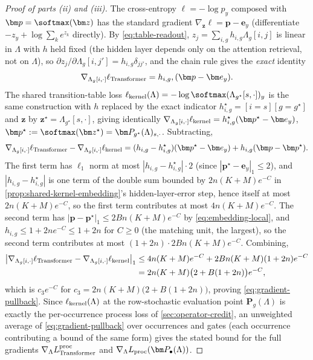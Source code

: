 \begin{proof}[Proof of parts (ii) and (iii)]
The cross-entropy $\ell=-\log p_y$ composed with $\bm p=\softmax(\bm z)$
has the standard gradient $\nabla_{\bm z}\ell=\bm p-\bm e_y$ (differentiate
$-z_y+\log\sum_ke^{z_k}$ directly). By \cref{eq:table-readout},
$z_j=\sum_{i,g}h_{i,g}\Lambda_g[i,j]$ is linear in $\Lambda$ with $h$ held fixed (the
hidden layer depends only on the attention retrieval, not on $\Lambda$), so
$\partial z_j/\partial \Lambda_g[i,j']=h_{i,g}\delta_{jj'}$, and the chain rule
gives the \emph{exact} identity
\begin{equation}
 \nabla_{\Lambda_g[i,\cdot]}\ell_{\rm Transformer}=h_{i,g},(\bm p-\bm e_y).
 \label{eq:exact-grad-identity}
\end{equation}
The shared transition-table loss $\ell_{\rm kernel}(\Lambda)=-\log\softmax(\Lambda_{g^\star}[s,\cdot])_y$
is the same construction with $h$ replaced by the exact indicator
$h^\star_{i,g}=[i=s][g=g^\star]$ and $\bm z$ by
$\bm z^\star=\Lambda_{g^\star}[s,\cdot]$, giving identically
$\nabla_{\Lambda_g[i,\cdot]}\ell_{\rm kernel}=h^\star_{i,g}(\bm p^\star-\bm e_y)$,
$\bm p^\star:=\softmax(\bm z^\star)=\bm P_{g^\star}(\Lambda)_{s,\cdot}$. Subtracting,
\[
 \nabla_{\Lambda_g[i,\cdot]}\ell_{\rm Transformer}-\nabla_{\Lambda_g[i,\cdot]}\ell_{\rm kernel}
 =(h_{i,g}-h^\star_{i,g})(\bm p^\star-\bm e_y)+h_{i,g}(\bm p-\bm p^\star).
\]
The first term has $\ell_1$ norm at most $|h_{i,g}-h^\star_{i,g}|\cdot2$
(since $|\bm p^\star-\bm e_y|_1\le2$), and $|h_{i,g}-h^\star_{i,g}|$ is one
term of the double sum bounded by $2n(K+M)e^{-C}$ in
\cref{prop:shared-kernel-embedding}'s hidden-layer-error step, hence itself
at most $2n(K+M)e^{-C}$, so the first term contributes at most
$4n(K+M)e^{-C}$. The second term has $|\bm p-\bm p^\star|_1\le
2Bn(K+M)e^{-C}$ by \cref{eq:embedding-local}, and $h_{i,g}\le1+2ne^{-C}\le
1+2n$ for $C\ge0$ (the matching unit, the largest), so the second term
contributes at most $(1+2n)\cdot2Bn(K+M)e^{-C}$. Combining,
\begin{align*}
 \bigl|\nabla_{\Lambda_g[i,\cdot]}\ell_{\rm Transformer}-\nabla_{\Lambda_g[i,\cdot]}\ell_{\rm kernel}\bigr|_1
 &\le4n(K+M)e^{-C}+2Bn(K+M)(1+2n)e^{-C}\\
 &=2n(K+M)\bigl(2+B(1+2n)\bigr)e^{-C},
\end{align*}
which is $c_3e^{-C}$ for $c_3=2n(K+M)\bigl(2+B(1+2n)\bigr)$, proving
\cref{eq:gradient-pullback}. Since
$\ell_{\rm kernel}(\Lambda)$ at the row-stochastic evaluation point
$\bm P_g(\Lambda)$ is exactly the per-occurrence process loss of
\cref{sec:operator-credit}, an unweighted average of
\cref{eq:gradient-pullback} over occurrences and gates (each occurrence
contributing a bound of the same form) gives the stated bound for the full
gradients $\nabla_\Lambda L_{\rm Transformer}^{\rm proc}$ and $\nabla_\Lambda L_{\rm
proc}(\bm P_\bullet(\Lambda))$.


\end{proof}
